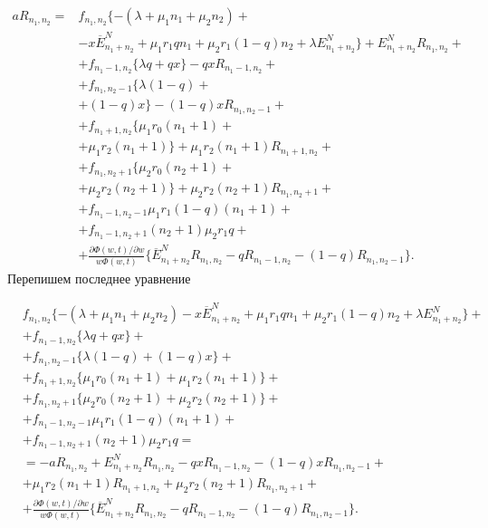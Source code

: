  \begin{equation*}
	\begin{split}
		aR_{n_{1}, n_{2}}=
		&f_{n_{1}, n_{2}}\{-(\lambda+\mu_{1}n_{1}+\mu_{2}n_{2}) +\\
		&-x\overline{E}_{n_{1}+n_{2}}^N+\mu_{1}r_{1}q n_{1}+ \mu_{2}r_{1}(1-q)n_{2}+ \lambda E_{n_{1}+n_{2}}^N\} + E_{n_{1}+n_{2}}^NR_{n_{1}, n_{2}} +\\
		&+f_{n_{1}-1, n_{2}}\{\lambda q+ q  x\}-q xR_{n_{1}-1, n_{2}}+\\
		&+ f_{n_{1}, n_{2}-1}\{\lambda (1-q) +\\
		&+ (1-q) x\} -(1-q) xR_{n_{1}, n_{2}-1}+ \\
		&+  f_{n_{1}+1, n_{2}}\{\mu_{1} r_{0}(n_{1}+1)+\\
		& + \mu_{1} r_{2}(n_{1}+1)\}+\mu_{1} r_{2}(n_{1}+1)R_{n_{1}+1, n_{2}}+\\
		&+ f_{n_{1}, n_{2}+1}\{\mu_{2} r_{0}(n_{2}+1)+\\
		& + \mu_{2} r_{2} (n_{2}+1)\} +\mu_{2} r_{2} (n_{2}+1)R_{n_{1}, n_{2}+1}+\\
		&+f_{n_{1}-1, n_{2}-1}\mu_{1} r_{1}(1-q)(n_{1}+1) +\\
		&+ f_{n_{1}-1, n_{2}+1}(n_{2}+1)\mu_{2} r_{1}q  +\\
		&+ \frac{\partial\Phi(w,t)/\partial w}{w\Phi(w,t)}\{ \overline{E}_{n_{1}+n_{2}}^NR_{n_{1}, n_{2}}-   q R_{n_{1}-1, n_{2}}- (1-q) R_{n_{1}, n_{2}-1}\}.
	\end{split}
\end{equation*}
Перепишем последнее уравнение

 \begin{equation}\label{sistemForF}
	\begin{split}
		&f_{n_{1}, n_{2}}\{-(\lambda+\mu_{1}n_{1}+\mu_{2}n_{2}) -x\overline{E}_{n_{1}+n_{2}}^N+\mu_{1}r_{1}q n_{1}+ \mu_{2}r_{1}(1-q)n_{2}+ \lambda E_{n_{1}+n_{2}}^N\}+\\
		&+f_{n_{1}-1, n_{2}}\{\lambda q+ q  x\}+\\
		&+ f_{n_{1}, n_{2}-1}\{\lambda (1-q) +(1-q) x\}+\\
		&+ f_{n_{1}+1, n_{2}}\{\mu_{1} r_{0}(n_{1}+1)+ \mu_{1} r_{2}(n_{1}+1)\}+\\
		&+ f_{n_{1}, n_{2}+1}\{\mu_{2} r_{0}(n_{2}+1) + \mu_{2} r_{2} (n_{2}+1)\}+\\
		&+f_{n_{1}-1, n_{2}-1}\mu_{1} r_{1}(1-q)(n_{1}+1) +\\
		&+ f_{n_{1}-1, n_{2}+1}(n_{2}+1)\mu_{2} r_{1}q  =\\
		& =-aR_{n_{1}, n_{2}}+ E_{n_{1}+n_{2}}^NR_{n_{1}, n_{2}} -q xR_{n_{1}-1, n_{2}} -(1-q) xR_{n_{1}, n_{2}-1}+\\
		& +\mu_{1} r_{2}(n_{1}+1)R_{n_{1}+1, n_{2}} +\mu_{2} r_{2} (n_{2}+1)R_{n_{1}, n_{2}+1}+\\
		&+ \frac{\partial\Phi(w,t)/\partial w}{w\Phi(w,t)}\{ \overline{E}_{n_{1}+n_{2}}^NR_{n_{1}, n_{2}}-   q R_{n_{1}-1, n_{2}}- (1-q) R_{n_{1}, n_{2}-1}\}.
	\end{split}
\end{equation}

